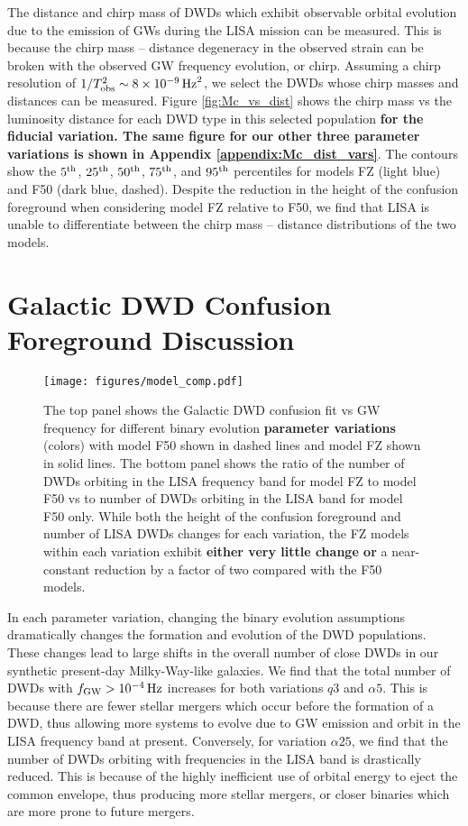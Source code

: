 \documentclass[twocolumn, linenumbers]{aastex631}
\begin{document}
The distance and chirp mass of DWDs which exhibit observable orbital evolution due to the emission of GWs during the LISA mission can be measured. This is because the chirp mass -- distance degeneracy in the observed strain can be broken with the observed GW frequency evolution, or chirp. Assuming a chirp resolution of $1/T_{\rm{obs}}^2 \sim 8\times10^{-9}\,\rm{Hz}^2$, we select the DWDs whose chirp masses and distances can be measured. Figure \ref{fig:Mc_vs_dist} shows the chirp mass vs the luminosity distance for each DWD type in this selected population \textbf{for the fiducial variation. The same figure for our other three parameter variations is shown in Appendix \ref{appendix:Mc_dist_vars}}. The contours show the $5^{\rm{th}}$, $25^{\rm{th}}$, $50^{\rm{th}}$, $75^{\rm{th}}$, and $95^{\rm{th}}$ percentiles for models FZ (light blue) and F50 (dark blue, dashed). Despite the reduction in the height of the confusion foreground when considering model FZ relative to F50, we find that LISA is unable to differentiate between the chirp mass -- distance distributions of the two models. 

\section{\textbf{Galactic DWD Confusion Foreground Discussion}}
\label{sec:model_compare}


\begin{figure}
	\texttt{[image: figures/model\_comp.pdf]}
    \caption{The top panel shows the Galactic DWD confusion fit vs GW frequency for different binary evolution \textbf{parameter variations} (colors) with model F50 shown in dashed lines and model FZ shown in solid lines. The bottom panel shows the ratio of the number of DWDs orbiting in the LISA frequency band for model FZ to model F50 vs to number of DWDs orbiting in the LISA band for model F50 only. While both the height of the confusion foreground and number of LISA DWDs changes for each variation, the FZ models within each variation exhibit \textbf{either very little change or }a  near-constant reduction by a factor of two compared with the F50 models.}
    \label{fig:model_comp}
\end{figure}

In each parameter variation, changing the binary evolution assumptions dramatically changes the formation and evolution of the DWD populations. These changes lead to large shifts in the overall number of close DWDs in our synthetic present-day Milky-Way-like galaxies. We find that the total number of DWDs with $f_{\rm{GW}}>10^{-4}\,\rm{Hz}$ increases for both variations $q3$ and $\alpha5$. This is because there are fewer stellar mergers which occur before the formation of a DWD, thus allowing more systems to evolve due to GW emission and orbit in the LISA frequency band at present. Conversely, for variation $\alpha25$, we find that the number of DWDs orbiting with frequencies in the LISA band is drastically reduced. This is because of the highly inefficient use of orbital energy to eject the common envelope, thus producing more stellar mergers, or closer binaries which are more prone to future mergers.
\end{document}
